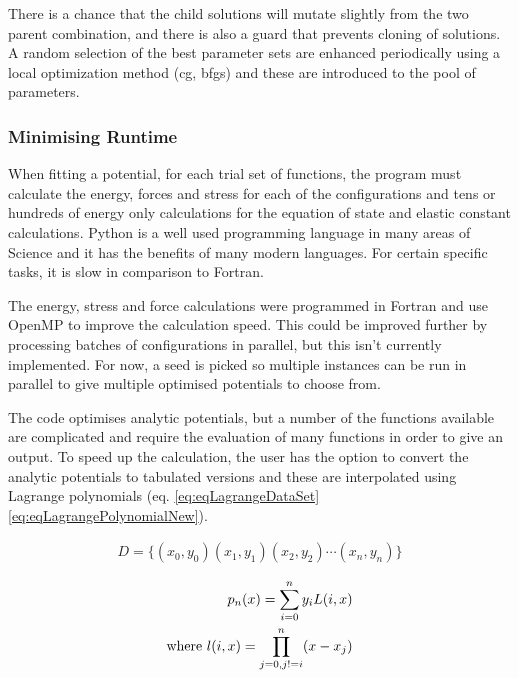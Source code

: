 There is a chance that the child solutions will mutate slightly from the two parent combination, and there is also a guard that prevents cloning of solutions.  A random selection of the best parameter sets are enhanced periodically using a local optimization method (\acrshort{cg}, \acrshort{bfgs}) and these are introduced to the pool of parameters.



\subsubsection{Minimising Runtime}

When fitting a potential, for each trial set of functions, the program must calculate the energy, forces and stress for each of the configurations and tens or hundreds of energy only calculations for the equation of state and elastic constant calculations.  Python is a well used programming language in many areas of Science and it has the benefits of many modern languages.  For certain specific tasks, it is slow in comparison to Fortran.

The energy, stress and force calculations were programmed in Fortran and use OpenMP to improve the calculation speed.  This could be improved further by processing batches of configurations in parallel, but this isn't currently implemented.  For now, a seed is picked so multiple instances can be run in parallel to give multiple optimised potentials to choose from.

The code optimises analytic potentials, but a number of the functions available are complicated and require the evaluation of many functions in order to give an output.  To speed up the calculation, the user has the option to convert the analytic potentials to tabulated versions and these are interpolated using Lagrange polynomials (eq. \ref{eq:eqLagrangeDataSet} \ref{eq:eqLagrangePolynomialNew}).

\begin{equation}
\begin{split}
D = \lbrace \left(x_0, y_0 \right) \left(x_1, y_1 \right) \left(x_2, y_2 \right) \dotsm \left(x_n, y_n \right) \rbrace
\end{split}
\label{eq:eqLagrangeDataSet}
\end{equation}

\begin{equation}
\begin{split}
p_n (x) = \sum _{i=0} ^n y_i L(i, x)  \\
\textnormal{where    } l(i, x) = \prod _{j=0 , j!=i} ^n (x - x_j)
\end{split}
\label{eq:eqLagrangePolynomialNew}
\end{equation}

